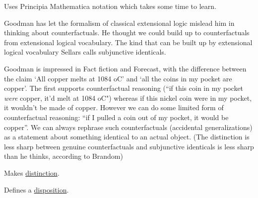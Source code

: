 Uses Principia Mathematica notation which takes some time to learn.

Goodman has let the formalism of classical extensional logic mislead him in thinking about counterfactuals. He thought we could build up to counterfactuals from extensional logical vocabulary. The kind that can be built up by extensional logical vocabulary Sellars calls subjunctive identicals.

Goodman is impressed in Fact fiction and Forecast, with the difference between the claim `All copper melts at 1084 oC' and `all the coins in my pocket are copper'. The first supports counterfactual reasoning (``if this coin in my pocket \emph{were} copper, it'd melt at 1084 oC") whereas if this nickel coin were in my pocket, it wouldn't be made of copper. However we can do some limited form of counterfactual reasoning: ``if I pulled a coin out of my pocket, it would be copper''. We can always rephrase such counterfactuals (accidental generalizations) as a statement about something identical to an actual object. (The distinction is less sharp between genuine counterfactuals and subjunctive identicals is less sharp than he thinks, according to Brandom)

Makes \href{doc/phil/People/Brandom/On Sellars/2009/Lecture04/Subjunctive vs counterfactual|source}{distinction}.

Defines a \href{doc/phil/People/Brandom/On Sellars/2009/Lecture04/Dispositions|source}{disposition}.